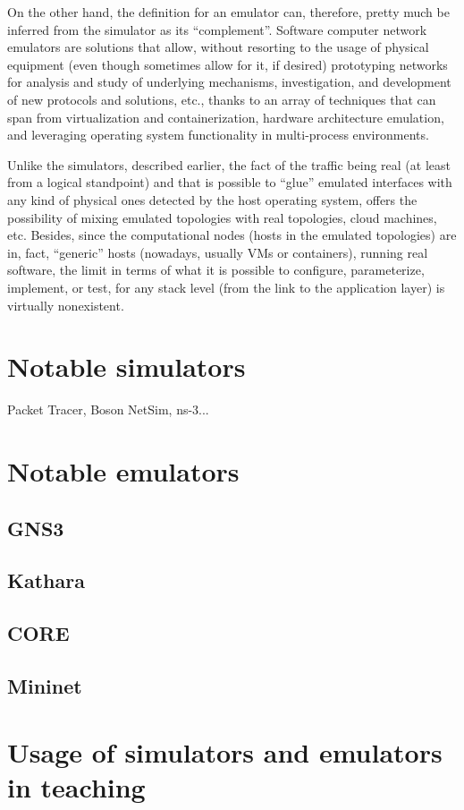 On the other hand, the definition for an emulator can, therefore, pretty much be inferred from the simulator as its ``complement''.
Software computer network emulators are solutions that allow, without resorting to the usage of physical equipment (even though sometimes allow for it, if desired) prototyping networks for analysis and study of underlying mechanisms, investigation, and development of new protocols and solutions, etc., thanks to an array of techniques that can span from virtualization and containerization, hardware architecture emulation, and leveraging operating system functionality in multi-process environments.

Unlike the simulators, described earlier, the fact of the traffic being real (at least from a logical standpoint) and that is possible to ``glue'' emulated interfaces with any kind of physical ones detected by the host operating system, offers the possibility of mixing emulated topologies with real topologies, cloud machines, etc.
Besides, since the computational nodes (hosts in the emulated topologies) are in, fact, ``generic'' hosts (nowadays, usually VMs or containers), running real software, the limit in terms of what it is possible to configure, parameterize, implement, or test, for any stack level (from the link to the application layer) is virtually nonexistent.

\section{Notable simulators}
\label{sec:notablsimulators}

Packet Tracer, Boson NetSim, ns-3...

\section{Notable emulators}
\label{sec:notablemulators}

\subsection{GNS3}
\label{subsec:relworkgns3}

\subsection{Kathara}
\label{subsec:relworkkathara}

\subsection{CORE}
\label{subsec:relworkcore}

\subsection{Mininet}
\label{subsec:relworkmininet}

\section{Usage of simulators and emulators in teaching}
\label{sec:simemulusage}

